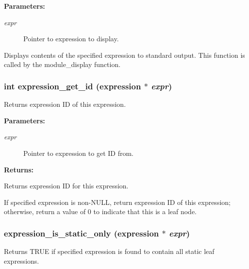 \begin{Desc}
\item[{\bf Parameters: }]\par
\begin{description}
\item[
{\em expr}]Pointer to expression to display.

\end{description}
\end{Desc}
Displays contents of the specified expression to standard output. This function is called by the module\_\-display function. 
\subsubsection{\setlength{\rightskip}{0pt plus 5cm}int expression\_\-get\_\-id ({\bf expression} $\ast$ {\em expr})}\label{expr_8c_a14}


Returns expression ID of this expression.

\begin{Desc}
\item[{\bf Parameters: }]\par
\begin{description}
\item[
{\em expr}]Pointer to expression to get ID from. \end{description}
\end{Desc}
\begin{Desc}
\item[{\bf Returns: }]\par
Returns expression ID for this expression.

\end{Desc}
If specified expression is non-NULL, return expression ID of this expression; otherwise, return a value of 0 to indicate that this is a leaf node. 
\subsubsection{ expression\_\-is\_\-static\_\-only ({\bf expression} $\ast$ {\em expr})}\label{expr_8c_a22}


Returns TRUE if specified expression is found to contain all static leaf expressions.

